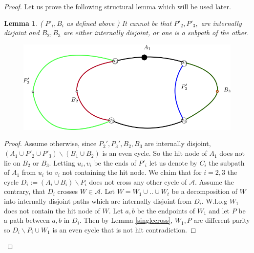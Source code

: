 \documentclass[letterpaper,11pt]{article}
\newtheorem{lemma}[theorem]{Lemma}
\newcommand{\0}{\mathbb{0}}
\newcommand{\1}{\mathbb{1}}
\begin{document}
\begin{proof}
 Let us prove the following structural lemma which will be used later. 
 \begin{lemma}\label{disjointP_i} 
 ( $P'_i, B_i $ as defined above ) It cannot be that  $P'_2, P'_3,  $ are internally disjoint and  $B_2, B_3$ are either internally disjoint, or one is a subpath of the other. 
\begin{figure}
        \includegraphics[scale=0.3]{DisjointP_i.png}
        \caption{}
        \label{disjointPi}
   \end{figure}
 \end{lemma}
\begin{proof}
Assume otherwise, since $P_2' , P_3' , B_2 ,B_3$ are internally disjoint,  $(A_1 \cup P'_2 \cup P'_3 ) \backslash (B_1 \cup B_2)$ is an even cycle. So the hit node of $A_1$ does not lie on $B_2$ or $B_3$.   %
Letting $u_i, v_i$ be the ends of $P'_i$ let us denote by $C_i$ the subpath of $A_1$ from $u_i$ to $v_i$ not containing the hit node. We claim that for $i=2,3$ the cycle $ D_i:= (A_i \cup B_i ) \backslash P_i$ does not cross any other cycle of $\mathcal{A}$.  Assume the contrary, that $D_i$ crosses $W \in \mathcal{A}$.  Let $W= W_1 \cup .. \cup W_t$ be a decomposition of $W$ into internally disjoint paths which are internally disjoint from $D_i$. W.l.o.g  $W_1$ does not contain  the hit node of $W$. Let $a,b$ be the endpoints of $W_1$ and let $P$ be a path between $a,b$ in $D_i$.  Then by Lemma \ref{singlecross}, $W_1 , P$ are different parity so $D_i \backslash P_i \cup W_1$ is an even cycle that is not hit contradiction.

\end{proof}
\end{proof}
\end{document}
